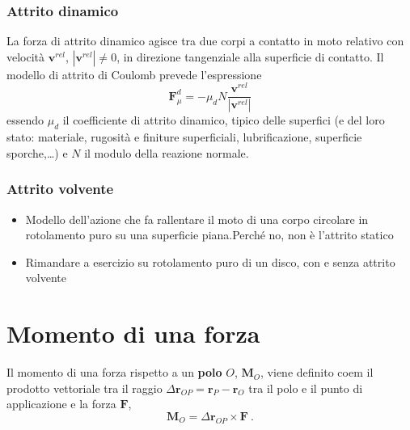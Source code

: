 \subsubsection{Attrito dinamico}
La forza di attrito dinamico agisce tra due corpi a contatto in moto relativo con velocità $\mathbf{v}^{rel}$, $|\mathbf{v}^{rel}| \ne 0$, in direzione tangenziale alla superficie di contatto. Il modello di attrito di Coulomb prevede l'espressione
\begin{equation}
    \mathbf{F}^d_{\mu} = - \mu_d N \dfrac{\mathbf{v}^{rel}}{|\mathbf{v}^{rel}|}
\end{equation}
essendo $\mu_d$ il coefficiente di attrito dinamico, tipico delle superfici (e del loro stato: materiale, rugosità e finiture superficiali, lubrificazione, superficie sporche,\dots) e $N$ il modulo della reazione normale.

\subsubsection{Attrito volvente}
{\color{red}
\begin{itemize}
    \item Modello dell'azione che fa rallentare il moto di una corpo circolare in rotolamento puro su una superficie piana.Perché no, non è l'attrito statico
    \item Rimandare a esercizio su rotolamento puro di un disco, con e senza attrito volvente
\end{itemize}
}

\section{Momento di una forza}
\begin{definition} Il momento di una forza rispetto a un \textbf{polo} $O$, $\mathbf{M}_O$, viene definito coem il prodotto vettoriale tra il raggio $\Delta \mathbf{r}_{OP} = \mathbf{r}_P - \mathbf{r}_O$ tra il polo e il punto di applicazione e la forza $\mathbf{F}$,
    \begin{equation} \mathbf{M}_O = \Delta \mathbf{r}_{OP} \times \mathbf{F} \ .
    \end{equation}
\end{definition}

